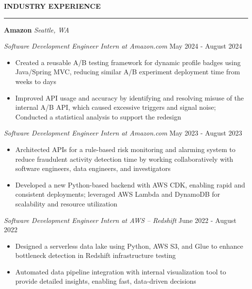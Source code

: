 \documentclass[11pt,a4paper]{article}
\newcommand{\sectionheading}[1]{\vspace{0.2cm}\textbf{\Large #1}\vspace{0.1cm}\hrule\vspace{0.3cm}}
\newcommand{\subheading}[1]{\textbf{#1}}
\newcommand{\daterange}[1]{\hfill{#1}}
\begin{document}
\sectionheading{INDUSTRY EXPERIENCE}
\subheading{Amazon} \hfill \textit{Seattle, WA}

\textit{Software Development Engineer Intern at Amazon.com} \daterange{May 2024 - August 2024}
\begin{itemize}[leftmargin=*,nosep]
    \item Created a reusable A/B testing framework for dynamic profile badges using Java/Spring MVC, reducing similar A/B experiment deployment time from weeks to days
    \item Improved API usage and accuracy by identifying and resolving misuse of the internal A/B API, which caused excessive triggers and signal noise; Conducted a statistical analysis to support the redesign
\end{itemize}

\smallbreak
\textit{Software Development Engineer Intern at Amazon.com} \daterange{May 2023 - August 2023}
\begin{itemize}[leftmargin=*,nosep]
    \item Architected APIs for a rule-based risk monitoring and alarming system to reduce fraudulent activity detection time by working collaboratively with software engineers, data engineers, and investigators
    \item Developed a new Python-based backend with AWS CDK, enabling rapid and consistent deployments; leveraged AWS Lambda and DynamoDB for scalability and resource utilization
\end{itemize}

\smallbreak
\textit{Software Development Engineer Intern at AWS -- Redshift} \daterange{June 2022 - August 2022}
\begin{itemize}[leftmargin=*,nosep]
    \item Designed a serverless data lake using Python, AWS S3, and Glue to enhance bottleneck detection in Redshift infrastructure testing
    \item Automated data pipeline integration with internal visualization tool to provide detailed insights, enabling fast, data-driven decisions
\end{itemize}

\end{document}
